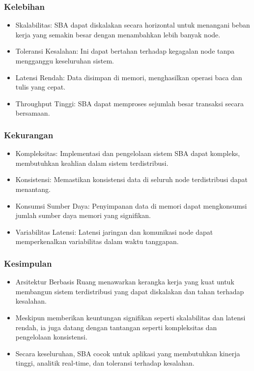 \documentclass[aspectratio=169, table]{beamer}
\begin{document}
    \begin{frame}
        \frametitle{Kelebihan}
        \begin{itemize}
            \item Skalabilitas: SBA dapat diskalakan secara horizontal untuk menangani beban kerja yang semakin besar dengan menambahkan lebih banyak node.
            \item Toleransi Kesalahan: Ini dapat bertahan terhadap kegagalan node tanpa mengganggu keseluruhan sistem.
            \item Latensi Rendah: Data disimpan di memori, menghasilkan operasi baca dan tulis yang cepat.
            \item Throughput Tinggi: SBA dapat memproses sejumlah besar transaksi secara bersamaan.
        \end{itemize}
    \end{frame}

    \begin{frame}
        \frametitle{Kekurangan}
        \begin{itemize}
            \item Kompleksitas: Implementasi dan pengelolaan sistem SBA dapat kompleks, membutuhkan keahlian dalam sistem terdistribusi.
            \item Konsistensi: Memastikan konsistensi data di seluruh node terdistribusi dapat menantang.
            \item Konsumsi Sumber Daya: Penyimpanan data di memori dapat mengkonsumsi jumlah sumber daya memori yang signifikan.
            \item Variabilitas Latensi: Latensi jaringan dan komunikasi node dapat memperkenalkan variabilitas dalam waktu tanggapan.
        \end{itemize}
    \end{frame}

    \begin{frame}
        \frametitle{Kesimpulan}
        \begin{itemize}
            \item Arsitektur Berbasis Ruang menawarkan kerangka kerja yang kuat untuk membangun sistem terdistribusi yang dapat diskalakan dan tahan terhadap kesalahan.
            \item Meskipun memberikan keuntungan signifikan seperti skalabilitas dan latensi rendah, ia juga datang dengan tantangan seperti kompleksitas dan pengelolaan konsistensi.
            \item Secara keseluruhan, SBA cocok untuk aplikasi yang membutuhkan kinerja tinggi, analitik real-time, dan toleransi terhadap kesalahan.
        \end{itemize}
    \end{frame}
\end{document}
